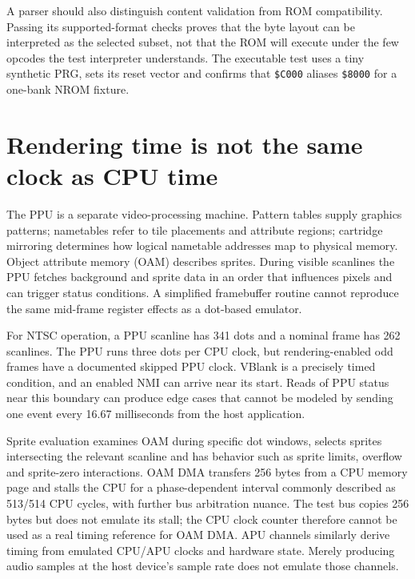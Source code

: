 A parser should also distinguish content validation from ROM compatibility. Passing its supported-format checks proves that the byte layout can be interpreted as the selected subset, not that the ROM will execute under the few opcodes the test interpreter understands. The executable test uses a tiny synthetic PRG, sets its reset vector and confirms that \texttt{\$C000} aliases \texttt{\$8000} for a one-bank NROM fixture.

\section{Rendering time is not the same clock as CPU time}\label{01-foundations-i-ch016-rendering-time-is-not-the-same-clock-as-cpu-time}

The PPU is a separate video-processing machine. Pattern tables supply graphics patterns; nametables refer to tile placements and attribute regions; cartridge mirroring determines how logical nametable addresses map to physical memory. Object attribute memory (OAM) describes sprites. During visible scanlines the PPU fetches background and sprite data in an order that influences pixels and can trigger status conditions. A simplified framebuffer routine cannot reproduce the same mid-frame register effects as a dot-based emulator.

For NTSC operation, a PPU scanline has 341 dots and a nominal frame has 262 scanlines. The PPU runs three dots per CPU clock, but rendering-enabled odd frames have a documented skipped PPU clock. VBlank is a precisely timed condition, and an enabled NMI can arrive near its start. Reads of PPU status near this boundary can produce edge cases that cannot be modeled by sending one event every 16.67 milliseconds from the host application.

Sprite evaluation examines OAM during specific dot windows, selects sprites intersecting the relevant scanline and has behavior such as sprite limits, overflow and sprite-zero interactions. OAM DMA transfers 256 bytes from a CPU memory page and stalls the CPU for a phase-dependent interval commonly described as 513/514 CPU cycles, with further bus arbitration nuance. The test bus copies 256 bytes but does not emulate its stall; the CPU clock counter therefore cannot be used as a real timing reference for OAM DMA. APU channels similarly derive timing from emulated CPU/APU clocks and hardware state. Merely producing audio samples at the host device's sample rate does not emulate those channels.

